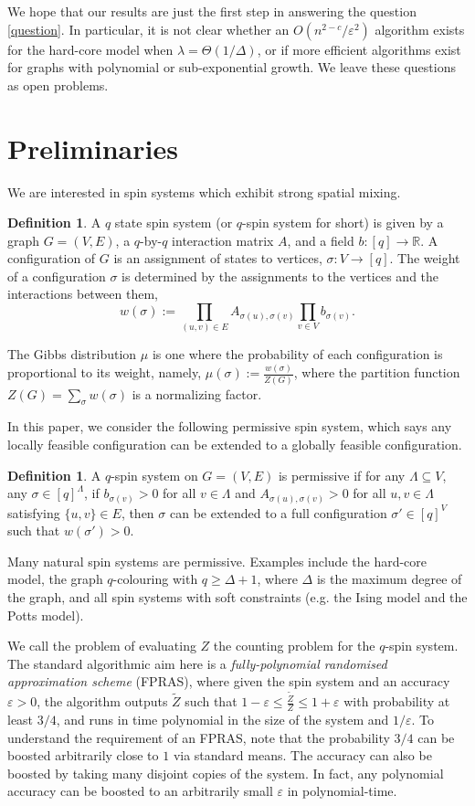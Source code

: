\documentclass[11pt,a4paper]{amsart}
\newcommand{\eps}{\varepsilon}
\newcommand{\defeq}{:=}
\theoremstyle{definition}
\newtheorem{definition}[theorem]{Definition}
\theoremstyle{remark}
\begin{document}
We hope that our results are just the first step in answering the question \eqref{question}.
In particular, it is not clear whether an $O(n^{2-c}/\eps^2)$ algorithm exists for the hard-core model when $\lambda=\Theta(1/\Delta)$,
or if more efficient algorithms exist for graphs with polynomial or sub-exponential growth.
We leave these questions as open problems.

\section{Preliminaries}\label{sec:prelim}
We are interested in spin systems which exhibit strong spatial mixing. 

\begin{definition}
  A $q$ state spin system (or $q$-spin system for short) is given by a graph $G=(V,E)$, a $q$-by-$q$ interaction matrix $A$, and a field $b:[q]\rightarrow\mathbb{R}$. A configuration of $G$ is an assignment of states to vertices, $\sigma: V\rightarrow[q]$. The weight of a configuration $\sigma$ is determined by the assignments to the vertices and the interactions between them,
\[w(\sigma)\defeq\prod_{(u,v)\in E}A_{\sigma(u),\sigma(v)}\prod_{v\in V}b_{\sigma(v)}.\]

The Gibbs distribution $\mu$ is one where the probability of each configuration is proportional to its weight, namely, $\mu(\sigma)\defeq\frac{w(\sigma)}{Z(G)}$, where the partition function $Z(G)=\sum_\sigma w(\sigma)$ is a normalizing factor. 
\end{definition}

In this paper, we consider the following permissive spin system, which says any locally feasible configuration can be extended to a globally feasible configuration.
\begin{definition}
A $q$-spin system on $G=(V,E)$ is permissive if for any $\Lambda \subseteq V$, any $\sigma \in [q]^\Lambda$, if $b_{\sigma(v)} > 0$ for all $v \in \Lambda$ and $A_{\sigma(u),\sigma(v)} > 0$ for all $u,v \in \Lambda$ satisfying $\{u,v\} \in E$, then $\sigma$ can be extended to a full configuration $\sigma' \in [q]^V$ such that $w(\sigma')>0$.
\end{definition}
Many natural spin systems are permissive. Examples include the hard-core model, the graph $q$-colouring with $q \geq \Delta + 1$, where $\Delta$ is the maximum degree of the graph, and all spin systems with soft constraints (e.g. the Ising model and the Potts model).

We call the problem of evaluating $Z$ the counting problem for the $q$-spin system.
The standard algorithmic aim here is a \emph{fully-polynomial randomised approximation scheme} (FPRAS),
where given the spin system and an accuracy $\eps>0$,
the algorithm outputs $\widetilde{Z}$ such that $1-\eps\le\frac{\widetilde{Z}}{Z}\le 1+\eps$ with probability at least $3/4$, and runs in time polynomial in the size of the system and $1/\eps$.
To understand the requirement of an FPRAS, note that the probability $3/4$ can be boosted arbitrarily close to $1$ via standard means.
The accuracy can also be boosted by taking many disjoint copies of the system.
In fact, any polynomial accuracy can be boosted to an arbitrarily small $\eps$ in polynomial-time.
\end{document}
